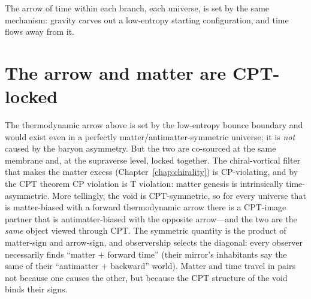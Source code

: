 The arrow of time within each branch, each universe, is set by the same
mechanism: gravity carves out a low-entropy starting configuration, and time
flows away from it.

\section{The arrow and matter are CPT-locked}

The thermodynamic arrow above is set by the low-entropy bounce boundary and would
exist even in a perfectly matter/antimatter-symmetric universe; it is \emph{not}
caused by the baryon asymmetry. But the two are co-sourced at the same membrane
and, at the supraverse level, locked together. The chiral-vortical filter that
makes the matter excess (Chapter~\ref{chap:chirality}) is CP-violating, and by
the CPT theorem CP violation is T violation: matter genesis is intrinsically
time-asymmetric. More tellingly, the void is CPT-symmetric, so for every
universe that is matter-biased with a forward thermodynamic arrow there is a
CPT-image partner that is antimatter-biased with the opposite arrow---and the two
are the \emph{same} object viewed through CPT. The symmetric quantity is the
product of matter-sign and arrow-sign, and observership selects the diagonal:
every observer necessarily finds ``matter $+$ forward time'' (their mirror's
inhabitants say the same of their ``antimatter $+$ backward'' world). Matter and
time travel in pairs not because one causes the other, but because the CPT
structure of the void binds their signs.

